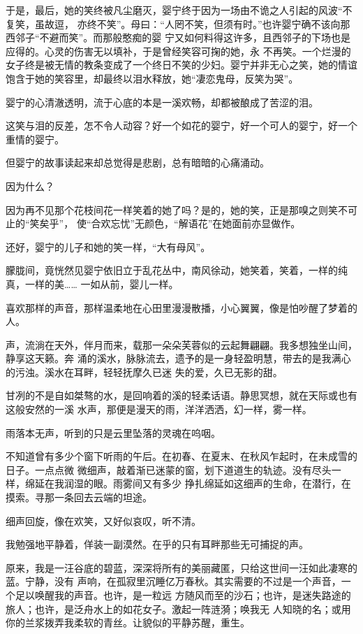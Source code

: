 \documentclass[12pt,a4paper]{article}
\begin{document}
		于是，最后，她的笑终被凡尘磨灭，婴宁终于因为一场由不诡之人引起的风波“不复笑，虽故逗，
	亦终不笑”。母曰：“人罔不笑，但须有时。”也许婴宁确不该向那西邻子“不避而笑”。而那般憨痴的婴
	宁又如何料得这许多，且西邻子的下场也是应得的。心灵的伤害无以填补，于是曾经笑容可掬的她，永
	不再笑。一个烂漫的女子终是被无情的教条变成了一个终日不笑的少妇。婴宁并非无心之笑，她的情谊
	饱含于她的笑容里，却最终以泪水释放，她“凄恋鬼母，反笑为哭”。

		婴宁的心清澈透明，流于心底的本是一溪欢畅，却都被酿成了苦涩的泪。

		这笑与泪的反差，怎不令人动容？好一个如花的婴宁，好一个可人的婴宁，好一个重情的婴宁。

		但婴宁的故事读起来却总觉得是悲剧，总有暗暗的心痛涌动。

		因为什么？

		因为再不见那个花枝间花一样笑着的她了吗？是的，她的笑，正是那嗅之则笑不可止的“笑矣乎”，
	使“合欢忘忧”无颜色，“解语花”在她面前亦显做作。

		还好，婴宁的儿子和她的笑一样，“大有母风”。

		朦胧间，竟恍然见婴宁依旧立于乱花丛中，南风徐动，她笑着，笑着，一样的纯真，一样的美……
	一如从前，婴儿一样。

	\endwriting



		喜欢那样的声音，那样温柔地在心田里漫漫散播，小心翼翼，像是怕吵醒了梦着的人。

		声，流淌在天外，伴月而来，载那一朵朵芙蓉似的云起舞翩翩。我多想独坐山间，静享这天籁。奔
	涌的溪水，脉脉流去，遗予的是一身轻盈明慧，带去的是我满心的污浊。溪水在耳畔，轻轻抚摩久已迷
	失的爱，久已无影的甜。

		甘冽的不是自如桀骜的水，是回响着的溪的轻柔话语。静思冥想，就在天际或也有这般安然的一溪
	水声，那便是漫天的雨，洋洋洒洒，幻一样，雾一样。

		雨落本无声，听到的只是云里坠落的灵魂在呜咽。

		不知道曾有多少个窗下听雨的午后。在初春、在夏末、在秋风乍起时，在未成雪的日子。一点点微
	微细声，敲着渐已迷蒙的窗，划下道道生的轨迹。没有尽头一样，绵延在我润湿的眼。雨雾间又有多少
	挣扎绵延如这细声的生命，在潜行，在摸索。寻那一条回去云端的坦途。

		细声回旋，像在欢笑，又好似哀叹，听不清。

		我勉强地平静着，佯装一副漠然。在乎的只有耳畔那些无可捕捉的声。

		原来，我是一汪谷底的碧蓝，深深将所有的美丽藏匿，只给这世间一汪如此凄寒的蓝。宁静，没有
	声响，在孤寂里沉睡亿万春秋。其实需要的不过是一个声音，一个足以唤醒我的声音。也许，是一粒远
	方随风而至的沙石；也许，是迷失路途的旅人；也许，是泛舟水上的如花女子。激起一阵涟漪；唤我无
	人知晓的名；或用你的兰浆拨弄我柔软的青丝。让貌似的平静苏醒，重生。
\end{document}
